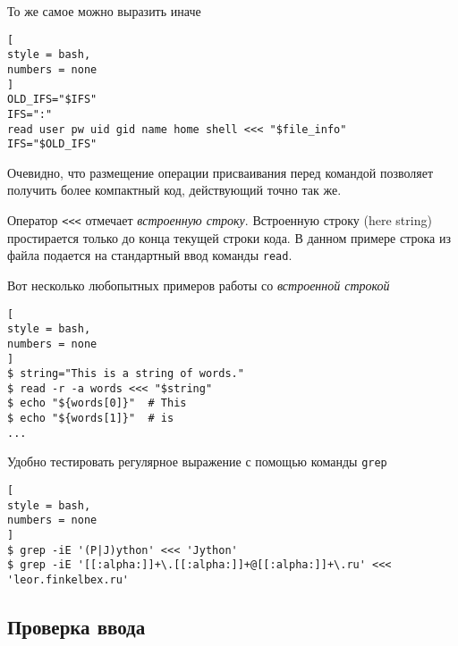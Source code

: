 \documentclass[%
	11pt,
	a4paper,
	utf8,
		]{article}
\begin{document}
То же самое можно выразить иначе
\begin{lstlisting}[
style = bash,
numbers = none
]
OLD_IFS="$IFS"
IFS=":"
read user pw uid gid name home shell <<< "$file_info"
IFS="$OLD_IFS"
\end{lstlisting}

Очевидно, что размещение операции присваивания перед командой позволяет получить более компактный код, действующий точно так же.

Оператор \verb|<<<| отмечает \emph{встроенную строку}. Встроенную строку (here string) простирается только до конца текущей строки кода. В данном примере строка из файла подается на стандартный ввод команды \texttt{read}.

Вот несколько любопытных примеров работы со \emph{встроенной строкой}
\begin{lstlisting}[
style = bash,
numbers = none
]
$ string="This is a string of words."
$ read -r -a words <<< "$string"
$ echo "${words[0]}"  # This
$ echo "${words[1]}"  # is
...
\end{lstlisting}

Удобно тестировать регулярное выражение с помощью команды \texttt{grep}
\begin{lstlisting}[
style = bash,
numbers = none
]
$ grep -iE '(P|J)ython' <<< 'Jython'
$ grep -iE '[[:alpha:]]+\.[[:alpha:]]+@[[:alpha:]]+\.ru' <<< 'leor.finkelbex.ru'
\end{lstlisting}

\subsection{Проверка ввода}
\end{document}
